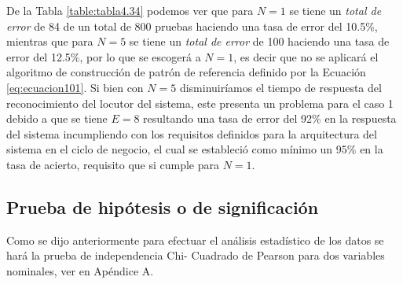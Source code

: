De la Tabla \ref{table:tabla4.34} podemos ver que para $N = 1$ se tiene un \textit{total de error} de 84 de un total de 800 pruebas haciendo una tasa de error del 10.5\%, mientras que para $N = 5$ se tiene un \textit{total de error} de 100 haciendo una tasa de error del 12.5\%, por lo que se escogerá a $N = 1$, es decir que no se aplicará el algoritmo de construcción de patrón de referencia definido por la Ecuación \eqref{eq:ecuacion101}. 
\vskip 0.5cm
Si bien con $N = 5$ disminuiríamos el tiempo de respuesta del reconocimiento del locutor del sistema, este presenta un problema para el caso 1 debido a que se tiene $E = 8$ resultando una tasa de error del 92\% en la respuesta del sistema incumpliendo con los requisitos definidos para la arquitectura del sistema en el ciclo de negocio, el cual se estableció como mínimo un 95\% en la tasa de acierto, requisito que si cumple para $N = 1$.

\subsection{Prueba de hipótesis o de significación}
Como se dijo anteriormente para efectuar el análisis estadístico de los datos se hará la prueba de independencia Chi- Cuadrado de Pearson para dos variables nominales, ver en Apéndice A.


